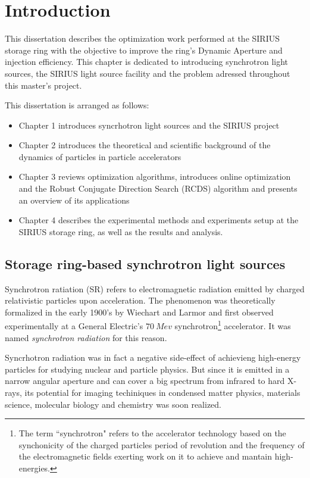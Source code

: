 \chapter{Introduction}
This dissertation describes the optimization work performed at the SIRIUS storage ring with the objective to improve the ring's Dynamic Aperture and injection efficiency.
 This chapter is dedicated to introducing synchrotron light sources, the SIRIUS light source facility and the problem adressed throughout this master's project.

This dissertation is arranged as follows:
\begin{itemize}
    \item Chapter 1 introduces syncrhotron light sources and the SIRIUS project
    \item Chapter 2 introduces the theoretical and scientific background of the dynamics of particles in particle accelerators
    \item Chapter 3 reviews optimization algorithms, introduces online optimization and the Robust Conjugate Direction Search (RCDS) algorithm and presents an overview of its applications
    \item Chapter 4 describes the experimental methods and experiments setup at the SIRIUS storage ring, as well as the results and analysis.
\end{itemize}

\section{Storage ring-based synchrotron light sources}

Synchrotron ratiation (SR) refers to electromagnetic radiation emitted by charged relativistic particles upon acceleration. The phenomenon was theoretically formalized in the early 1900's by Wiechart and Larmor and first observed experimentally at a General Electric's $70~\unit{Mev}$ synchrotron\footnote{The term ``synchrotron" refers to the accelerator  technology based on the synchonicity of the charged particles period of revolution and the frequency of the electromagnetic fields exerting work on it to achieve and mantain high-energies.} accelerator. It was named \textit{synchrotron radiation} for this reason.

Syncrhotron radiation was in fact a negative side-effect of achievieng high-energy particles for studying nuclear and particle physics. But since it is emitted in a narrow angular aperture and can cover a big spectrum from infrared to hard X-rays, its potential for imaging techiniques in condensed matter physics, materials science, molecular biology and chemistry was soon realized.

